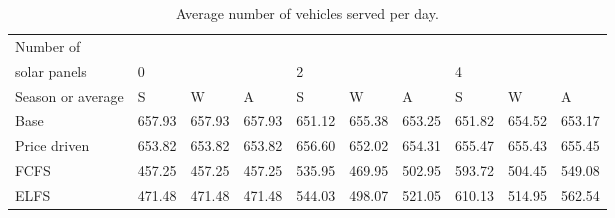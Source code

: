 \begin{table}[h]
\centering
\begin{tabular}{l|lll|lll|lll}Number of \\ solar panels&0& & &2& & &4& & \\ \hline
Season or average & S & W & A & S & W & A & S & W & A \\ \hline
Base&657.93&657.93&657.93&651.12&655.38&653.25&651.82&654.52&653.17 \\
Price driven&653.82&653.82&653.82&656.60&652.02&654.31&655.47&655.43&655.45 \\
FCFS&457.25&457.25&457.25&535.95&469.95&502.95&593.72&504.45&549.08 \\
ELFS&471.48&471.48&471.48&544.03&498.07&521.05&610.13&514.95&562.54 \\
\end{tabular}
\caption{Average number of vehicles served per day.}
\label{avg num served}
\end{table}
